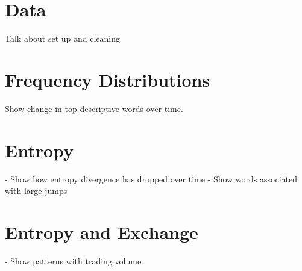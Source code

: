 \section{Data}

Talk about set up and cleaning

\section{Frequency Distributions}

Show change in top descriptive words over time.

\section{Entropy}

- Show how entropy divergence has dropped over time
- Show words associated with large jumps

\section{Entropy and Exchange}

- Show patterns with trading volume


